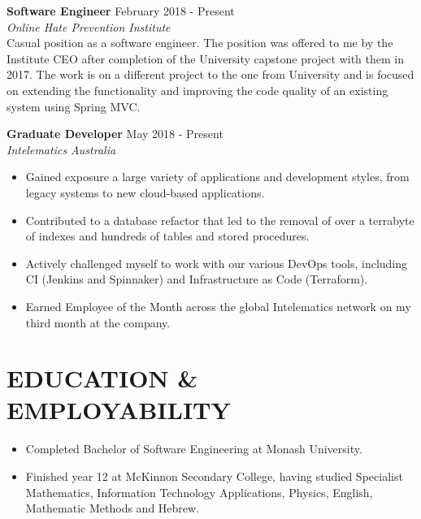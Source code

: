 \documentclass[margin, 10pt]{res} %
\begin{document}
\begin{resume}
\textbf{Software Engineer} \hfill February 2018 - Present \\
{\sl Online Hate Prevention Institute} \\
Casual position as a software engineer. The position was offered to me by the Institute CEO after completion of the University capstone project with them in 2017. The work is on a different project to the one from University and is focused on extending the functionality and improving the code quality of an existing system using Spring MVC.

\textbf{Graduate Developer} \hfill May 2018 - Present \\
{\sl Intelematics Australia} \\
\begin{itemize}
\item Gained exposure a large variety of applications and development styles, from legacy systems to new cloud-based applications.
\item Contributed to a database refactor that led to the removal of over a terrabyte of indexes and hundreds of tables and stored procedures.
\item Actively challenged myself to work with our various DevOps tools, including CI (Jenkins and Spinnaker) and Infrastructure as Code (Terraform).
\item Earned Employee of the Month across the global Intelematics network on my third month at the company.
\end{itemize} 


\section{EDUCATION \& \\ EMPLOYABILITY}

\begin{itemize}
\item Completed Bachelor of Software Engineering at Monash University. %
\item Finished  year  12  at  McKinnon  Secondary  College, having  studied  Specialist  Mathematics, Information Technology Applications, Physics, English, Mathematic Methods and Hebrew.
\end{itemize}


\end{resume}
\end{document}
